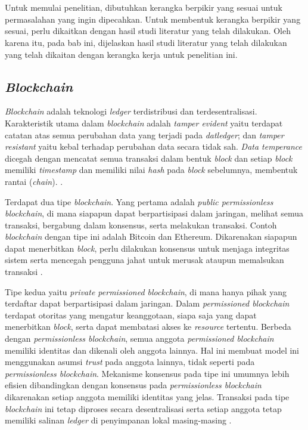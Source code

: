\chapter{\babDua}
\label{bab:2}
Untuk memulai penelitian, dibutuhkan kerangka berpikir yang sesuai untuk permasalahan yang ingin dipecahkan. Untuk membentuk kerangka berpikir yang sesuai, perlu dikaitkan dengan hasil studi literatur yang telah dilakukan. Oleh karena itu, pada bab ini, dijelaskan hasil studi literatur yang telah dilakukan yang telah dikaitan dengan kerangka kerja untuk penelitian ini.


\section{\textit{Blockchain}}
\label{sec:litblockchain}

\textit{Blockchain} adalah teknologi \textit{ledger} terdistribusi dan terdesentralisasi. Karakteristik utama dalam \textit{blockchain} adalah \textit{tamper evident} yaitu terdapat catatan atas semua perubahan data yang terjadi pada \textit{datledger}; dan \textit{tamper resistant} yaitu kebal terhadap perubahan data secara tidak sah. \textit{Data temperance} dicegah dengan mencatat semua transaksi dalam bentuk \textit{block} dan setiap \textit{block} memiliki \textit{timestamp} dan memiliki nilai \textit{hash} pada \textit{block} sebelumnya, membentuk rantai (\textit{chain}). \citep{Ahmed2020} \citep{Yaga2018}. 

Terdapat dua tipe \textit{blockchain}. Yang pertama adalah \textit{public permissionless blockchain}, di mana siapapun dapat berpartisipasi dalam jaringan, melihat semua transaksi, bergabung dalam konsensus, serta melakukan transaksi. Contoh \textit{blockchain} dengan tipe ini adalah Bitcoin dan Ethereum. Dikarenakan siapapun dapat menerbitkan \textit{block}, perlu dilakukan konsensus untuk menjaga integritas sistem serta mencegah pengguna jahat untuk merusak ataupun memalsukan transaksi \citep{Yaga2018}.

Tipe kedua yaitu \textit{private permissioned blockchain}, di mana hanya pihak yang terdaftar dapat berpartisipasi dalam jaringan. Dalam \textit{permissioned blockchain} terdapat otoritas yang mengatur keanggotaan, siapa saja yang dapat menerbitkan \textit{block}, serta dapat membatasi akses ke \textit{resource} tertentu. Berbeda dengan \textit{permissionless blockchain}, semua anggota \textit{permissioned blockchain} memiliki identitas dan dikenali oleh anggota lainnya. Hal ini membuat model ini menggunakan asumsi \textit{trust} pada anggota lainnya, tidak seperti pada \textit{permissionless blockchain}. Mekanisme konsensus pada tipe ini umumnya lebih efisien dibandingkan dengan konsensus pada \textit{permissionless blockchain} dikarenakan setiap anggota memiliki identitas yang jelas. Transaksi pada tipe \textit{blockchain} ini tetap diproses secara desentralisasi serta setiap anggota tetap memiliki salinan \textit{ledger} di penyimpanan lokal masing-masing \citep{Yaga2018}.


